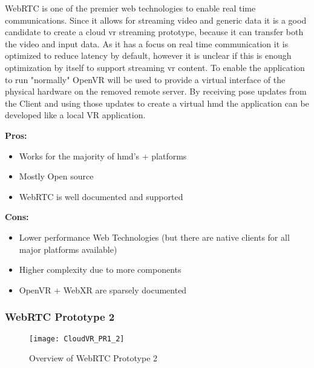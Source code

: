 WebRTC is one of the premier web technologies to enable real time communications. Since it allows for streaming video and generic data it is a good candidate to create a cloud \acrshort{vr} streaming prototype, because it can transfer both the video and input data. As it has a focus on real time communication it is optimized to reduce latency by default, however it is unclear if this is enough optimization by itself to support streaming \acrshort{vr} content. To enable the application to run "normally" OpenVR will be used to provide a virtual interface of the physical hardware on the removed remote server. By receiving pose updates from the Client and using those updates to create a virtual \acrshort{hmd} the application can be developed like a local VR application. \\
\newline
\begin{varwidth}[t]{.5\textwidth}
\renewcommand\labelitemi{+}
\textbf{Pros:}
\begin{itemize}
\item Works for the majority of \acrshort{hmd}'s + platforms
\item Mostly Open source
\item WebRTC is well documented and supported
\end{itemize}
\end{varwidth}
\hspace{4em}
\begin{varwidth}[t]{.5\textwidth}
\renewcommand\labelitemi{-}
\textbf{Cons:}
\begin{itemize}
\item Lower performance Web Technologies (but there are native clients for all major platforms available)
\item Higher complexity due to more components
\item OpenVR + WebXR are sparsely documented
\end{itemize}
\end{varwidth}

\subsubsection{WebRTC Prototype 2}
\begin{figure}[h!]
\caption{Overview of WebRTC Prototype 2}
\label{fig:pr12}
\texttt{[image: CloudVR\_PR1\_2]}
\end{figure}

